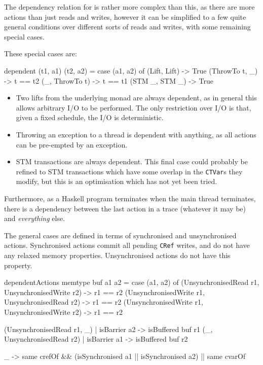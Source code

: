 The dependency relation for \dejafu{} is rather more complex than
this, as there are more actions than just reads and writes, however it
can be simplified to a few quite general conditions over different
sorts of reads and writes, with some remaining special cases.

These special cases are:

\begin{haskellcode}
dependent (t1, a1) (t2, a2) = case (a1, a2) of
  (Lift, Lift)   -> True
  (ThrowTo t, _) -> t == t2
  (_, ThrowTo t) -> t == t1
  (STM _, STM _) -> True
\end{haskellcode}

\begin{itemize}
\item Two lifts from the underlying monad are always dependent, as in
  general this allows arbitrary I/O to be performed. The only
  restriction over I/O is that, given a fixed schedule, the I/O is
  deterministic.

\item Throwing an exception to a thread is dependent with anything, as
  all actions can be pre-empted by an exception.

\item STM transactions are always dependent. This final case could
  probably be refined to STM transactions which have some overlap in
  the \verb|CTVar|s they modify, but this is an optimisation which has
  not yet been tried.
\end{itemize}

Furthermore, as a Haskell program terminates when the main thread
terminates, there is a dependency between the last action in a trace
(whatever it may be) and \emph{everything} else.

The general cases are defined in terms of synchronised and
unsynchronised actions. Synchronised actions commit all pending
\verb|CRef| writes, and do not have any relaxed memory
properties. Unsynchronised actions do not have this property.

\begin{haskellcode}
dependentActions memtype buf a1 a2 = case (a1, a2) of
  (UnsynchronisedRead  r1, UnsynchronisedWrite r2) -> r1 == r2
  (UnsynchronisedWrite r1, UnsynchronisedRead  r2) -> r1 == r2
  (UnsynchronisedWrite r1, UnsynchronisedWrite r2) -> r1 == r2

  (UnsynchronisedRead r1, _) | isBarrier a2 -> isBuffered buf r1
  (_, UnsynchronisedRead r2) | isBarrier a1 -> isBuffered buf r2

  _ -> same crefOf && (isSynchronised a1 || isSynchronised a2) || same cvarOf
\end{haskellcode}

